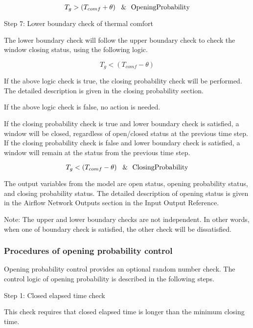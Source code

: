\begin{equation}
T_g > \left(T_{comf} + \theta\right)~~\&~~\rm{OpeningProbability}
\end{equation}

Step 7: Lower boundary check of thermal comfort

The lower boundary check will follow the upper boundary check to check the window closing status, using the following logic.

\begin{equation}
T_g < \left(T_{comf} - \theta\right)
\end{equation}

If the above logic check is true, the closing probability check will be performed. The detailed description is given in the closing probability section.

If the above logic check is false, no action is needed.

If the closing probability check is true and lower boundary check is satisfied, a window will be closed, regardless of open/closed status at the previous time step. If the closing probability check is false and lower boundary check is satisfied, a window will remain at the status from the previous time step.

\begin{equation}
T_g < \left(T_{comf} - \theta\right)~~\&~~\rm{ClosingProbability}
\end{equation}

The output variables from the model are open status, opening probability status, and closing probability status. The detailed description of opening status is given in the Airflow Network Outputs section in the Input Output Reference.

Note: The upper and lower boundary checks are not independent. In other words, when one of boundary check is satisfied, the other check will be dissatisfied.

\subsubsection{Procedures of opening probability control}\label{procedures-of-opening-probability-control}

Opening probability control provides an optional random number check. The control logic of opening probability is described in the following steps.

Step 1: Closed elapsed time check

This check requires that closed elapsed time is longer than the minimum closing time.

